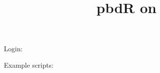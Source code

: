 \documentclass[a4paper,10pt]{article}
\title{pbdR on \whichcomp}
\author{}
\date{}
\begin{document}
\maketitle

\tokens

Login: \login

Example scripts: \pbd
\end{document}
